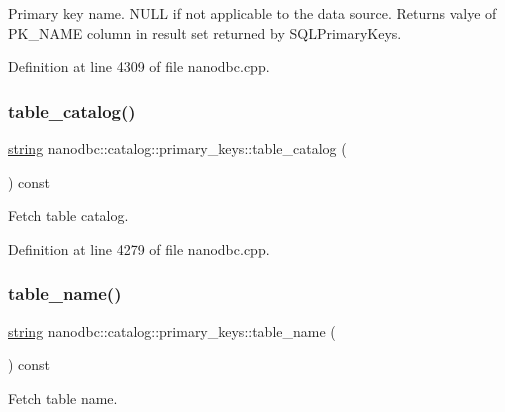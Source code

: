Primary key name. N\+U\+LL if not applicable to the data source. Returns valye of P\+K\+\_\+\+N\+A\+ME column in result set returned by S\+Q\+L\+Primary\+Keys. 



Definition at line 4309 of file nanodbc.\+cpp.

\mbox{\label{classnanodbc_1_1catalog_1_1primary__keys_afbfca580980e280e66819c2f0a3240f6}} 
\subsubsection{\texorpdfstring{table\_catalog()}{table\_catalog()}}
{\footnotesize\ttfamily \mbox{\hyperlink{namespacenanodbc_abfc0ece56278e590911ec8352774c212}{string}} nanodbc\+::catalog\+::primary\+\_\+keys\+::table\+\_\+catalog (\begin{DoxyParamCaption}{ }\end{DoxyParamCaption}) const}



Fetch table catalog. 



Definition at line 4279 of file nanodbc.\+cpp.

\mbox{\label{classnanodbc_1_1catalog_1_1primary__keys_a94dd82e753c3fd03bdd946298b1b187a}} 
\subsubsection{\texorpdfstring{table\_name()}{table\_name()}}
{\footnotesize\ttfamily \mbox{\hyperlink{namespacenanodbc_abfc0ece56278e590911ec8352774c212}{string}} nanodbc\+::catalog\+::primary\+\_\+keys\+::table\+\_\+name (\begin{DoxyParamCaption}{ }\end{DoxyParamCaption}) const}



Fetch table name. 




